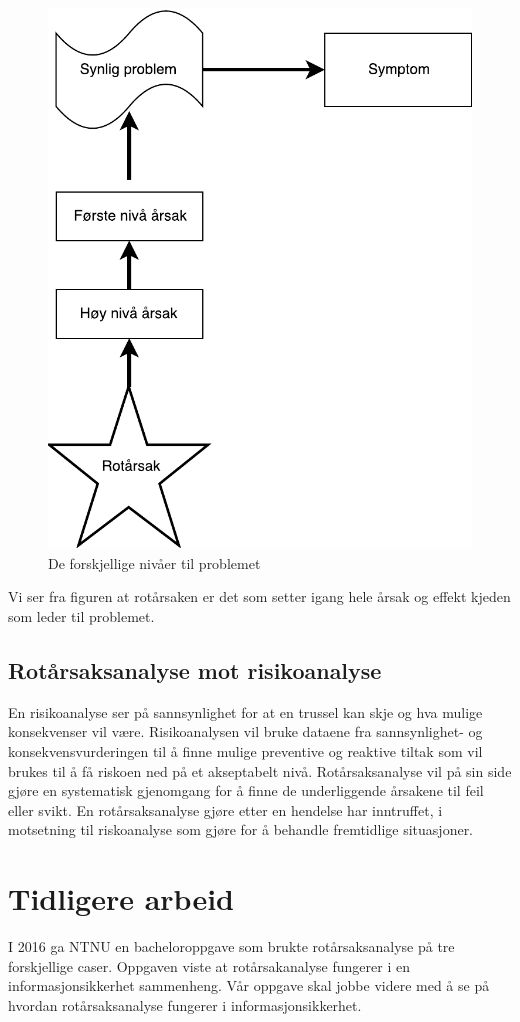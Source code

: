 \begin{figure}[H]
    \centering
    \includegraphics[scale=0.6]{main/bilder/nivaa.pdf}
    \caption[Nivå]{De forskjellige nivåer til problemet}
    \label{fig:nivaa}
\end{figure}

Vi ser fra figuren at rotårsaken er det som setter igang hele årsak og effekt kjeden som leder til problemet. 

    \subsection{Rotårsaksanalyse mot risikoanalyse}
    En risikoanalyse ser på sannsynlighet for at en trussel kan skje og hva mulige konsekvenser vil være. Risikoanalysen vil bruke dataene fra sannsynlighet- og konsekvensvurderingen til å finne mulige preventive og reaktive tiltak som vil brukes til å få riskoen ned på et akseptabelt nivå. Rotårsaksanalyse vil på sin side gjøre en systematisk gjenomgang for å finne de underliggende årsakene til feil eller svikt. En rotårsaksanalyse gjøre etter en hendelse har inntruffet, i motsetning til riskoanalyse som gjøre for å behandle fremtidlige situasjoner.    
\section{Tidligere arbeid}
 I 2016 ga NTNU en bacheloroppgave som brukte rotårsaksanalyse på tre forskjellige caser. Oppgaven viste at rotårsakanalyse fungerer i en informasjonsikkerhet sammenheng. Vår oppgave skal jobbe videre med å se på hvordan rotårsaksanalyse fungerer i informasjonsikkerhet.    

